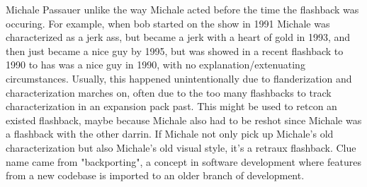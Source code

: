 \documentclass[12pt]{book}
\begin{document}
Michale Passauer unlike the way Michale acted before the time the flashback was occuring. For example, when bob started on the show in 1991 Michale was characterized as a jerk ass, but became a jerk with a heart of gold in 1993, and then just became a nice guy by 1995, but was showed in a recent flashback to 1990 to has was a nice guy in 1990, with no explanation/extenuating circumstances. Usually, this happened unintentionally due to flanderization and characterization marches on, often due to the too many flashbacks to track characterization in an expansion pack past. This might be used to retcon an existed flashback, maybe because Michale also had to be reshot since Michale was a flashback with the other darrin. If Michale not only pick up Michale's old characterization but also Michale's old visual style, it's a retraux flashback. Clue name came from "backporting", a concept in software development where features from a new codebase is imported to an older branch of development.
\end{document}
